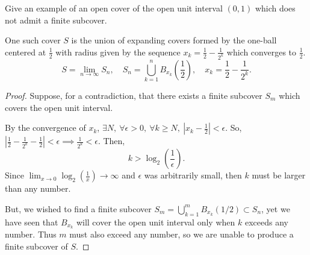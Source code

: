 \documentclass[../hw3]{subfiles}
\begin{document}
\begin{problem}[1]
Give an example of an open cover of the open unit interval $(0,1)$ which does not admit a finite subcover.
\end{problem}
\begin{proposition}
	One such cover $S$ is the union of expanding covers formed by the one-ball centered at $\frac{1}{2}$ with radius given by the sequence $x_k=\frac{1}{2}-\frac{1}{2^k}$ which converges to $\frac{1}{2}$. \[
		S=\lim_{n \to \infty} S_n,\quad S_n= \bigcup^{n}_{k=1}  B_{x_k}\left( \frac{1}{2} \right) ,\quad x_k = \frac{1}{2}-\frac{1}{2^k}
		.\]
\end{proposition}
\begin{proof}
	Suppose, for a contradiction, that there exists a finite subcover $S_m$ which covers the open unit interval.

	By the convergence of $x_k$, $\exists N,\ \forall \epsilon>0,\ \forall k\ge N,\ \left|x_k-\frac{1}{2}\right|<\epsilon$. So, $\left|\frac{1}{2}-\frac{1}{2^k}-\frac{1}{2}\right|<\epsilon\implies \frac{1}{2^k}<\epsilon$. Then,  \[
		k>\log_2\left( \frac{1}{\epsilon} \right)
		.\]
	Since $\lim_{x\to 0}\log_2\left( \frac{1}{x} \right) \to \infty$ and $\epsilon$ was arbitrarily small, then  $k$ must be larger than any number.

	But, we wished to find a finite subcover $S_m=\bigcup\limits_{k=1}^{m}B_{x_k}(1 / 2)\subset S_n$, yet we have seen that $B_{x_k}$ will cover the open unit interval only when  $k$ exceeds any number. Thus $m$ must also exceed any number, so we are unable to produce a finite subcover of $S$.
\end{proof}
\end{document}
